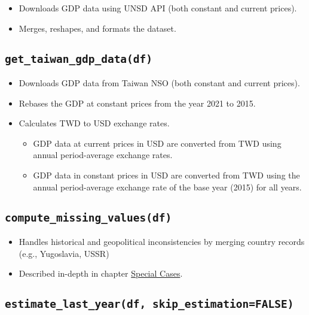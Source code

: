 \documentclass[
]{book}
\providecommand{\tightlist}{%
  \setlength{\itemsep}{0pt}\setlength{\parskip}{0pt}}
\begin{document}
\begin{itemize}
\tightlist
\item
  Downloads GDP data using UNSD API (both constant and current prices).
\item
  Merges, reshapes, and formats the dataset.
\end{itemize}

\subsection*{\texorpdfstring{\texttt{get\_taiwan\_gdp\_data(df)}}{get\_taiwan\_gdp\_data(df)}}\label{get_taiwan_gdp_datadf}

\begin{itemize}
\tightlist
\item
  Downloads GDP data from Taiwan NSO (both constant and current prices).
\item
  Rebases the GDP at constant prices from the year 2021 to 2015.
\item
  Calculates TWD to USD exchange rates.

  \begin{itemize}
  \tightlist
  \item
    GDP data at current prices in USD are converted from TWD using annual period-average exchange rates.
  \item
    GDP data in constant prices in USD are converted from TWD using the annual period-average exchange rate of the base year (2015) for all years.
  \end{itemize}
\end{itemize}

\subsection*{\texorpdfstring{\texttt{compute\_missing\_values(df)}}{compute\_missing\_values(df)}}\label{compute_missing_valuesdf}

\begin{itemize}
\tightlist
\item
  Handles historical and geopolitical inconsistencies by merging country records (e.g., Yugoslavia, USSR)
\item
  Described in-depth in chapter \hyperref[special-cases]{Special Cases}.
\end{itemize}

\subsection*{\texorpdfstring{\texttt{estimate\_last\_year(df,\ skip\_estimation=FALSE)}}{estimate\_last\_year(df, skip\_estimation=FALSE)}}\label{estimate_last_yeardf-skip_estimationfalse}
\end{document}
